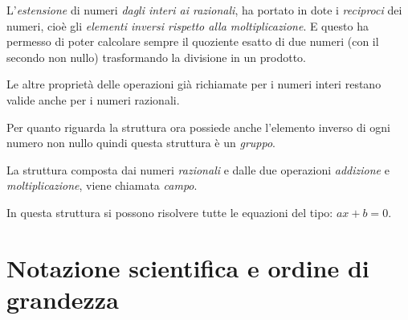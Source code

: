 L'\emph{estensione} di numeri \emph{dagli interi ai razionali},
ha portato in dote i \emph{reciproci} dei numeri, cioè gli 
\emph{elementi inversi rispetto alla moltiplicazione}. 
E questo ha permesso di poter calcolare sempre il quoziente esatto di due 
numeri (con il secondo non nullo) trasformando la divisione in un prodotto.

Le altre proprietà delle operazioni già richiamate per i numeri interi 
restano valide anche per i numeri razionali.

Per quanto riguarda la struttura  ora possiede anche 
l'elemento inverso di ogni numero non nullo quindi questa struttura è un 
\emph{gruppo}.

La struttura composta dai numeri \emph{razionali} e dalle due operazioni 
\emph{addizione} e \emph{moltiplicazione},  viene 
chiamata \emph{campo}.

In questa struttura si possono risolvere tutte le equazioni del tipo:
\(ax +b = 0\).

% 

\section{Notazione scientifica e ordine di grandezza}
\label{sec:razionali_notazione_scientifica}

